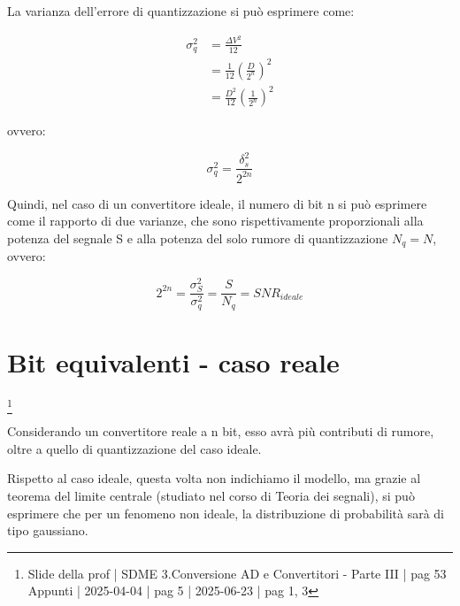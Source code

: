 La varianza dell'errore di quantizzazione si può esprimere come: 

{
    \Large 
    \begin{equation}
        \begin{split}
        \sigma_q ^{2} 
        &= 
        \frac{\Delta V ^{2}}{12}
        \\ 
        &= 
        \frac{1}{12}
        \left(\frac{D}{2^{n}}\right)^{2}
        \\ 
        &= 
        \frac{D^{2}}{12}
        \left(\frac{1}{2^{n}}\right)^{2}
        \end{split} 
    \end{equation}
}

ovvero: 

{
    \Large 
    \begin{equation}
        \sigma_q ^{2} 
        = 
        \frac{\delta_s ^{2}}{2^{2n}}
    \end{equation}
}

Quindi, nel caso di un convertitore ideale, il numero di bit n si può esprimere come il 
rapporto di due varianze, che sono rispettivamente proporzionali alla potenza del segnale S e alla potenza 
del solo rumore di quantizzazione $N_q = N$, ovvero: 

{
    \Large
    \begin{equation}
        2^{2n} = \frac{\sigma_S ^{2}}{\sigma_q ^{2}} 
        = 
        \frac{S}{N_q} 
        = 
        SNR_{ideale}
    \end{equation}
}

\newpage 

\section{Bit equivalenti - caso reale}
\footnote{Slide della prof | SDME 3.Conversione AD e Convertitori - Parte III | pag 53 \\  
Appunti | 2025-04-04 | pag 5 | 2025-06-23 | pag 1, 3}


Considerando un convertitore reale a n bit, esso avrà più contributi di rumore, oltre a quello di quantizzazione del caso ideale. \newline

Rispetto al caso ideale, questa volta non indichiamo il modello, ma grazie al teorema del limite centrale (studiato nel corso di Teoria dei segnali), 
si può esprimere che per un fenomeno non ideale, la distribuzione di probabilità sarà di tipo gaussiano. \newline 

